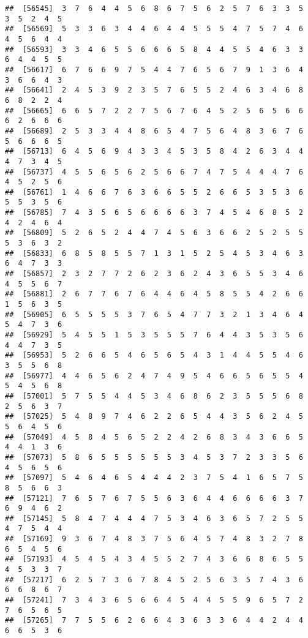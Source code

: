 \documentclass[
]{book}
\begin{document}
\begin{verbatim}
##  [56545]  3  7  6  4  4  5  6  8  6  7  5  6  2  5  7  6  3  3  5  3  5  2  4  5
##  [56569]  5  3  3  6  3  4  4  6  4  4  5  5  5  4  7  5  7  4  6  4  5  6  4  4
##  [56593]  3  3  4  6  5  5  6  6  6  5  8  4  4  5  5  4  6  3  3  6  4  4  5  5
##  [56617]  6  7  6  6  9  7  5  4  4  7  6  5  6  7  9  1  3  6  4  3  6  6  4  3
##  [56641]  2  4  5  3  9  2  3  5  7  6  5  5  2  4  6  3  4  6  8  6  8  2  2  4
##  [56665]  6  6  5  7  2  2  7  5  6  7  6  4  5  2  5  6  5  6  6  6  2  6  6  6
##  [56689]  2  5  3  3  4  4  8  6  5  4  7  5  6  4  8  3  6  7  6  5  6  6  6  5
##  [56713]  6  4  5  6  9  4  3  3  4  5  3  5  8  4  2  6  3  4  4  4  7  3  4  5
##  [56737]  4  5  5  6  5  6  2  5  6  6  7  4  7  5  4  4  4  7  6  4  5  2  5  6
##  [56761]  1  4  6  6  7  6  3  6  6  5  5  2  6  6  5  3  5  3  6  5  5  3  5  6
##  [56785]  7  4  3  5  6  5  6  6  6  6  3  7  4  5  4  6  8  5  2  4  2  4  6  4
##  [56809]  5  2  6  5  2  4  4  7  4  5  6  3  6  6  2  5  2  5  5  5  3  6  3  2
##  [56833]  6  8  5  8  5  5  7  1  3  1  5  2  5  4  5  3  4  6  3  6  4  7  3  3
##  [56857]  2  3  2  7  7  2  6  2  3  6  2  4  3  6  5  5  3  4  6  4  5  5  6  7
##  [56881]  2  6  7  7  6  7  6  4  4  6  4  5  8  5  5  4  2  6  6  1  5  6  3  5
##  [56905]  6  5  5  5  5  3  7  6  5  4  7  7  3  2  1  3  4  6  4  5  4  7  3  6
##  [56929]  5  4  5  5  1  5  3  5  5  5  7  6  4  4  3  5  3  5  6  4  4  7  3  5
##  [56953]  5  2  6  6  5  4  6  5  6  5  4  3  1  4  4  5  5  4  6  3  5  5  6  8
##  [56977]  4  4  6  5  6  2  4  7  4  9  5  4  6  6  5  6  5  5  4  5  4  5  6  8
##  [57001]  5  7  5  5  4  4  5  3  4  6  8  6  2  3  5  5  5  6  8  2  5  6  3  7
##  [57025]  5  4  8  9  7  4  6  2  2  6  5  4  4  3  5  6  2  4  5  5  6  4  5  6
##  [57049]  4  5  8  4  5  6  5  2  2  4  2  6  8  3  4  3  6  6  5  4  4  1  3  6
##  [57073]  5  8  6  5  5  5  5  5  5  3  4  5  3  7  2  3  3  5  6  4  5  6  5  6
##  [57097]  5  4  6  4  6  5  4  4  4  2  3  7  5  4  1  6  5  7  5  8  5  6  6  3
##  [57121]  7  6  5  7  6  7  5  5  6  3  6  4  4  6  6  6  6  3  7  6  9  4  6  2
##  [57145]  5  8  4  7  4  4  4  7  5  3  4  6  3  6  5  7  2  5  5  4  7  5  4  4
##  [57169]  9  3  6  7  4  8  3  7  5  6  4  5  7  4  8  3  2  7  8  6  5  4  5  6
##  [57193]  4  5  4  5  4  3  4  5  5  2  7  4  3  6  6  8  6  5  5  4  5  3  3  7
##  [57217]  6  2  5  7  3  6  7  8  4  5  2  5  6  3  5  7  4  3  6  6  6  8  6  7
##  [57241]  7  3  4  3  6  5  6  6  4  5  4  4  5  5  9  6  5  7  2  7  6  5  6  5
##  [57265]  7  7  5  5  6  2  6  6  4  3  6  3  3  6  4  4  2  4  4  6  6  5  3  6

\end{verbatim}
\end{document}
